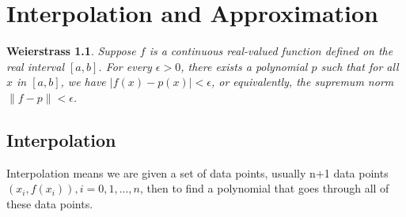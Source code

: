 \newtheorem*{Weierstrass}{Weierstrass}
\newtheorem*{existunique}{Existence and Uniqueness}
\chapter{Interpolation and Approximation}
\begin{Weierstrass}
	Suppose $f$ is a continuous real-valued function defined on the real interval $[a,b]$. For every $\epsilon > 0$, there exists a polynomial $p$ such that for all $x$ in $[a,b]$, we have $|f(x)-p(x)| < \epsilon$, or equivalently, the supremum norm $\left\| f-p \right\|< \epsilon$.
\end{Weierstrass}

\section{Interpolation}
Interpolation means we are given a set of data points, usually n+1 data points $(x_i,f(x_i)),i=0,1,...,n$, then to find a polynomial that goes through all of these data points.


